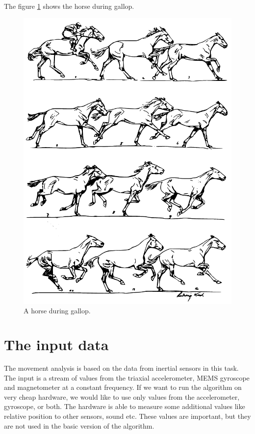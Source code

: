 The figure \ref{fig:gallop} shows the horse during gallop.

\begin{figure}
	\centering
	\caption{A horse during gallop. \cite{Duruttya2005}}
	\label{fig:gallop}
	\includegraphics[width=\linewidth]{img/trysk.pdf}
\end{figure}

\section{The input data}
The movement analysis is based on the data from inertial sensors in this task. The input is a stream of values from the triaxial accelerometer, \ac{MEMS} gyroscope and magnetometer at a constant frequency. If we want to run the algorithm on very cheap hardware, we would like to use only values from the accelerometer, gyroscope, or both. The  hardware is able to measure some additional values like relative position to other sensors, sound etc. These values are important, but they are not used in the basic version of the algorithm.

